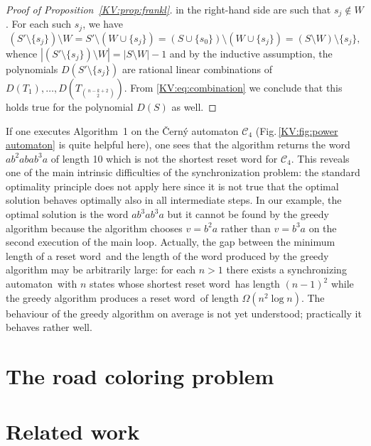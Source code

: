 \documentclass{irmaart}
\newcommand{\san}{synchronizing au\-tom\-a\-ton}
\newcommand{\sw}{reset word}
\theoremstyle{plain}
\begin{document}
\begin{proof}[Proof of Proposition~\ref{KV:prop:frankl}]
in the right-hand side are such that $s_j\notin W$. For each such $s_j$, we
have
\begin{displaymath}
(S'\setminus\{s_j\})\setminus
W=S'\setminus(W\cup\{s_j\})=(S\cup\{s_0\})\setminus(W\cup\{s_j\})=(S\setminus
W)\setminus\{s_j\},
\end{displaymath}
whence $|(S'\setminus\{s_j\})\setminus W|=|S\setminus W|-1$ and by the
inductive assumption, the polynomials $D(S'\setminus\{s_j\})$ are rational
linear combinations of $D(T_1),\dots,D(T_{\binom{n-k+2}2})$. From
\eqref{KV:eq:combination} we conclude that this holds true for the polynomial
$D(S)$ as well.
\end{proof}



If one executes Algorithm~1 on the \v{C}ern\'{y} automaton $\mathcal{C}_{4}$
(Fig.\,\ref{KV:fig:power automaton} is quite helpful here), one sees that the
algorithm returns the word $ab^2abab^3a$ of length 10 which is not the shortest
reset word for $\mathcal{C}_{4}$. This reveals one of the main intrinsic
difficulties of the synchronization problem: the standard optimality principle
does not apply here since it is not true that the optimal solution behaves
optimally also in all intermediate steps. In our example, the optimal solution
is the word $ab^3ab^3a$ but it cannot be found by the greedy algorithm because
the algorithm chooses $v=b^2a$ rather than $v=b^3a$ on the second execution of
the main loop. Actually, the gap between the minimum length of a \sw\ and the
length of the word produced by the greedy algorithm may be arbitrarily large:
for each $n>1$ there exists a \san\ with $n$ states whose shortest \sw\ has
length $(n-1)^2$ while the greedy algorithm produces a \sw\ of length
$\Omega(n^2\log n)$. The behaviour of the greedy algorithm on average is not
yet understood; practically it behaves rather well.

\section{The road coloring problem}
\label{KV:sec:rcp}

\section{Related work}
\label{KV:sec:related}


\begin{footnotesize}
  
\end{footnotesize}


\markright{\indexname}\markboth{\indexname}{\indexname}
\printindex
\end{document}

